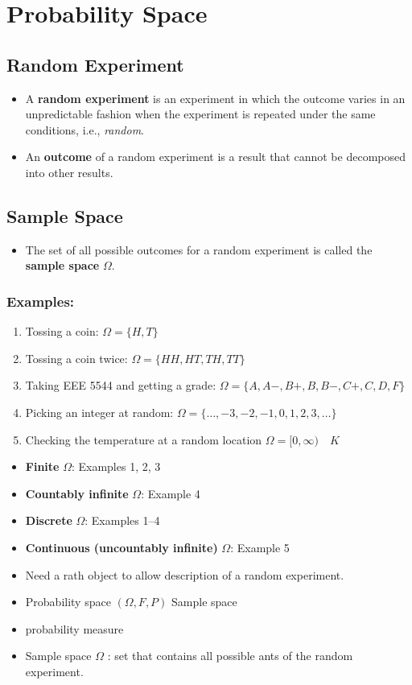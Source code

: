 \section{Probability Space}

\subsection{Random Experiment}
\begin{itemize}
\item A \textbf{random experiment} is an experiment in which the
outcome varies in an unpredictable fashion when the experiment is
repeated under the same conditions, i.e., \emph{random}.
\item An \textbf{outcome} of a random experiment is a result that
cannot be decomposed into other results.
\end{itemize}

\subsection{Sample Space}
\begin{itemize}
\item The set of all possible outcomes for a random experiment is
called the \textbf{sample space} \(\Omega\).
\end{itemize}

\subsubsection{Examples:}
\begin{enumerate}
\item Tossing a coin: \(\Omega=\{H, T\}\)
\item Tossing a coin twice: \(\Omega=\{H H, H T, T H, T T\}\)
\item Taking EEE 5544 and getting a grade:
\(
\Omega=\{A, A-, B+, B, B-, C+, C, D, F\}
\)
\item Picking an integer at random:
\(\Omega=\{\ldots,-3,-2,-1,0,1,2,3, \ldots \}\)
\item Checking the temperature at a random location
\(
\Omega=[0, \infty) \quad K
\)
\end{enumerate}

\begin{itemize}
\item \textbf{Finite} \(\Omega\): Examples 1, 2, 3
\item \textbf{Countably infinite} \(\Omega\): Example 4
\item \textbf{Discrete} \(\Omega\):  Examples 1--4
\item \textbf{Continuous (uncountably infinite)} \(\Omega\):  Example
5
\end{itemize}



\begin{itemize}
  \item[-] Need a rath object to allow description of a random experiment.
  \item[-] Probability space \((\Omega, F, P)\) Sample space
  \item[] probability measure
  \item[-] Sample space \(\Omega\) : set that contains all possible ants of the random experiment.
\end{itemize}

